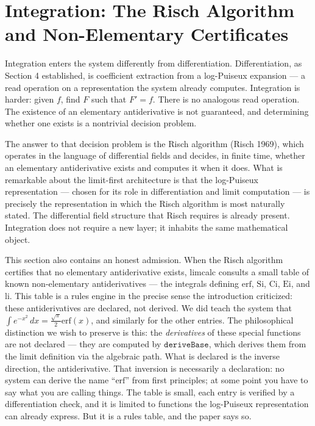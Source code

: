 \documentclass[12pt]{article}
\begin{document}
\section{Integration: The Risch Algorithm and Non-Elementary
Certificates}\label{integration-the-risch-algorithm-and-non-elementary-certificates}

Integration enters the system differently from differentiation.
Differentiation, as Section 4 established, is coefficient extraction
from a log-Puiseux expansion --- a read operation on a representation
the system already computes. Integration is harder: given \(f\), find
\(F\) such that \(F' = f\). There is no analogous read operation. The
existence of an elementary antiderivative is not guaranteed, and
determining whether one exists is a nontrivial decision problem.

The answer to that decision problem is the Risch algorithm (Risch 1969),
which operates in the language of differential fields and decides, in
finite time, whether an elementary antiderivative exists and computes it
when it does. What is remarkable about the limit-first architecture is
that the log-Puiseux representation --- chosen for its role in
differentiation and limit computation --- is precisely the
representation in which the Risch algorithm is most naturally stated.
The differential field structure that Risch requires is already present.
Integration does not require a new layer; it inhabits the same
mathematical object.

This section also contains an honest admission. When the Risch algorithm
certifies that no elementary antiderivative exists, limcalc consults a
small table of known non-elementary antiderivatives --- the integrals
defining \(\mathrm{erf}\), \(\mathrm{Si}\), \(\mathrm{Ci}\),
\(\mathrm{Ei}\), and \(\mathrm{li}\). This table is a rules engine in
the precise sense the introduction criticized: these antiderivatives are
declared, not derived. We did teach the system that
\(\int e^{-x^2}\,dx = \frac{\sqrt{\pi}}{2}\mathrm{erf}(x)\), and
similarly for the other entries. The philosophical distinction we wish
to preserve is this: the \emph{derivatives} of these special functions
are not declared --- they are computed by \(\mathtt{deriveBase}\), which
derives them from the limit definition via the algebraic path. What is
declared is the inverse direction, the antiderivative. That inversion is
necessarily a declaration: no system can derive the name
``\(\mathrm{erf}\)'' from first principles; at some point you have to
say what you are calling things. The table is small, each entry is
verified by a differentiation check, and it is limited to functions the
log-Puiseux representation can already express. But it is a rules table,
and the paper says so.
\end{document}
